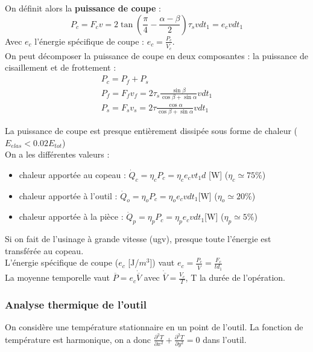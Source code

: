 \documentclass[../main.tex]{subfiles}
\begin{document}
On définit alors la \textbf{puissance de coupe} : \\
\begin{equation}
    P_c = F_cv = 2\tan(\frac{\pi}{4}-\frac{\alpha-\beta}{2})\tau_s vdt_1 = e_c vdt_1
\end{equation}
Avec $e_c$ l'énergie spécifique de coupe : $e_c = \frac{P_c}{\dot{V}_c}$. \\
On peut décomposer la puissance de coupe en deux composantes : la puissance de cisaillement et de frottement : \\
\begin{equation}
\begin{gathered}
    P_c = P_f+P_s\\
    P_f = F_fv_f = 2\tau_s \frac{\sin{\beta}}{\cos{\beta}+\sin{\alpha}} vdt_1\\
    P_s = F_sv_s = 2\tau \frac{\cos{\alpha}}{\cos{\beta}+\sin{\alpha}} vdt_1
    \end{gathered}
\end{equation}

La puissance de coupe est presque entièrement dissipée sous forme de chaleur ($E_{elas}<0.02 E_{tot}$)\\

On a les différentes valeurs :\begin{itemize}
    \item chaleur apportée au copeau : $\dot{Q}_c = \eta_c P_c = \eta_c e_c vt_1d$ [W] ($\eta_c \simeq 75\%$)\\
    \item chaleur apportée à l'outil : $\dot{Q}_o = \eta_o P_c = \eta_o e_c vdt_1$[W] ($\eta_o \simeq 20\%$)\\
    \item chaleur apportée à la pièce : $\dot{Q}_p = \eta_p P_c = \eta_p e_c vdt_1$[W] ($\eta_p \simeq 5\%$)\\
\end{itemize}
Si on fait de l'usinage à grande vitesse (ugv), presque toute l'énergie est transférée au copeau.\\
L'énergie spécifique de coupe ($e_c$ [J/$m^3$]) vaut $e_c = \frac{P_c}{\dot{V}} = \frac{F_c}{td_1}$\\
La moyenne temporelle vaut $\overline{P} = e_c \dot{\overline{V}}$ avec $\dot{\overline{V}} = \frac{V_c}{T}$, T la durée de l'opération.\\


\subsubsection{Analyse thermique de l'outil}
On considère une température stationnaire en un point de l'outil. La fonction de température est harmonique, on a donc $\frac{\partial^2 T}{\partial x^2} + \frac{\partial^2T}{\partial y^2} = 0$ dans l'outil. \\
\end{document}
